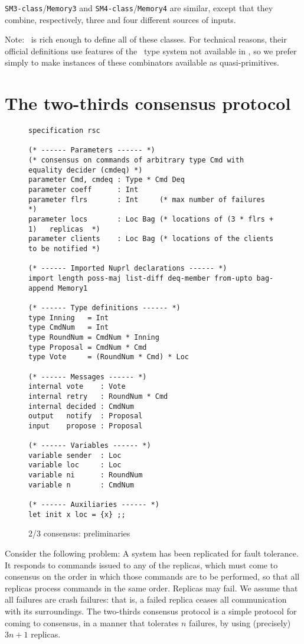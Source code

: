 \documentclass[final]{article}
\begin{document}
\lstinline{SM3-class}/\lstinline{Memory3} and
\lstinline{SM4-class}/\lstinline{Memory4} are similar, except that
they combine, respectively, three and four different sources of
inputs.

Note: \eml\ is rich enough to define all of these classes.  For
technical reasons, their official definitions use features of the
\nuprl\ type system not available in \eml, so we prefer simply to make
instances of these combinators available as quasi-primitives.




\section{The two-thirds consensus protocol}
\label{sec:simple-consensus}

\begin{figure}[!t]
  \begin{lstlisting}[basicstyle=\small]
specification rsc

(* ------ Parameters ------ *)
(* consensus on commands of arbitrary type Cmd with equality decider (cmdeq) *)
parameter Cmd, cmdeq : Type * Cmd Deq
parameter coeff      : Int
parameter flrs       : Int     (* max number of failures                  *)
parameter locs       : Loc Bag (* locations of (3 * flrs + 1)   replicas  *)
parameter clients    : Loc Bag (* locations of the clients to be notified *)

(* ------ Imported Nuprl declarations ------ *)
import length poss-maj list-diff deq-member from-upto bag-append Memory1

(* ------ Type definitions ------ *)
type Inning   = Int
type CmdNum   = Int
type RoundNum = CmdNum * Inning
type Proposal = CmdNum * Cmd
type Vote     = (RoundNum * Cmd) * Loc

(* ------ Messages ------ *)
internal vote    : Vote
internal retry   : RoundNum * Cmd
internal decided : CmdNum
output   notify  : Proposal
input    propose : Proposal

(* ------ Variables ------ *)
variable sender  : Loc
variable loc     : Loc
variable ni      : RoundNum
variable n       : CmdNum

(* ------ Auxiliaries ------ *)
let init x loc = {x} ;;
  \end{lstlisting}
  \caption{2/3 consensus: preliminaries}
  \label{fig:simple-consensus-header}
\end{figure}


Consider the following problem: A system has been replicated for fault
tolerance.  It responds to commands issued to any of the replicas,
which must come to consensus on the order in which those commands are
to be performed, so that all replicas process commands in the same
order.  Replicas may fail.  We assume that all failures are crash
failures: that is, a failed replica ceases all communication with its
surroundings.  The two-thirds consensus protocol is a simple protocol
for coming to consensus, in a manner that tolerates $n$ failures, by
using (precisely) $3n+1$ replicas.
\end{document}

